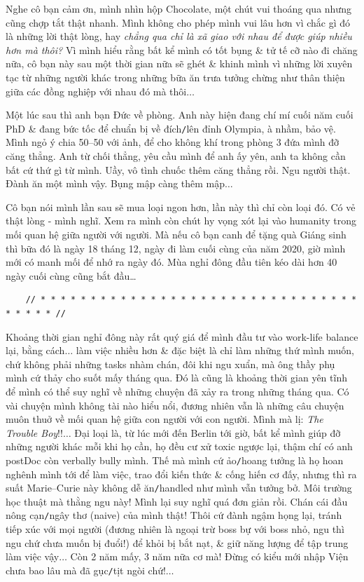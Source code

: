 \documentclass[12pt]{article}
\begin{document}
Nghe cô bạn cảm ơn, mình nhìn hộp Chocolate, một chút vui thoáng qua nhưng cũng chợp tắt thật nhanh. Mình không cho phép mình vui lâu hơn vì chắc gì đó là những lời thật lòng, hay {\it chẳng qua chỉ là xã giao với nhau để được giúp nhiều hơn mà thôi?} Vì mình hiểu rằng bất kể mình có tốt bụng \& tử tế cỡ nào đi chăng nữa, cô bạn này sau một thời gian nữa sẽ ghét \& khinh mình vì những lời xuyên tạc từ những người khác trong những bữa ăn trưa tưởng chừng như thân thiện giữa các đồng nghiệp với nhau đó mà thôi$\ldots$

Một lúc sau thì anh bạn Đức về phòng. Anh này hiện đang chí mí cuối năm cuối PhD \& đang bức tốc để chuẩn bị về đích{\tt/}lên đỉnh Olympia, à nhầm, bảo vệ. Mình ngỏ ý chia 50--50 với ảnh, để cho không khí trong phòng 3 đứa mình đỡ căng thẳng. Anh từ chối thẳng, yêu cầu mình để anh ấy yên, anh ta không cần bất cứ thứ gì từ mình. Uầy, vô tình chuốc thêm căng thẳng rồi. Ngu người thật. Đành ăn một mình vậy. Bụng mập càng thêm mập$\ldots$

Cô bạn nói mình lần sau sẽ mua loại ngon hơn, lần này thì chỉ còn loại đó. Có vẻ thật lòng - mình nghĩ. Xem ra mình còn chút hy vọng xót lại vào humanity trong mối quan hệ giữa người với người. Mà nếu cô bạn canh để tặng quà Giáng sinh thì bữa đó là ngày 18 tháng 12, ngày đi làm cuối cùng của năm 2020, giờ mình mới có manh mối để nhớ ra ngày đó. Mùa nghỉ đông đầu tiên kéo dài hơn 40 ngày cuối cùng cũng bắt đầu\ldots

\begin{verbatim}
	// * * * * * * * * * * * * * * * * * * * * * * * * * * * * * * * * * * * * * //
\end{verbatim}

\noindent
{} Khoảng thời gian nghỉ đông này rất quý giá để mình đầu tư vào work-life balance lại, bằng cách$\ldots$ làm việc nhiều hơn \& đặc biệt là chỉ làm những thứ mình muốn, chứ không phải những tasks nhàm chán, đôi khi ngu xuẩn, mà ông thầy phụ mình cứ thảy cho suốt mấy tháng qua. Đó là cũng là khoảng thời gian yên tĩnh để mình có thể suy nghĩ về những chuyện đã xảy ra trong những tháng qua. Có vài chuyện mình không tài nào hiểu nổi, đương nhiên vẫn là những câu chuyện muôn thuở về mối quan hệ giữa con người với con người. Mình mà lị: {\it The Trouble Boy}!!$\ldots$ Đại loại là, từ lúc mới đến Berlin tới giờ, bất kể mình giúp đỡ những người khác mỗi khi họ cần, họ đều cư xử toxic ngược lại, thậm chí có anh postDoc còn verbally bully mình. Thế mà mình cứ ảo{\tt/}hoang tưởng là họ hoan nghênh mình tới để làm việc, trao đổi kiến thức \& cống hiến cơ đấy, nhưng thì ra suất Marie--Curie này không dễ ăn{\tt/}handled như mình vẫn tưởng bở. Môi trường học thuật mà thằng ngu này! Mình lại suy nghĩ quá đơn giản rồi. Chán cái đầu nông cạn{\tt/}ngây thơ (naive) của mình thật! Thôi cứ đành ngậm họng lại, tránh tiếp xúc với mọi người (đương nhiên là ngoại trừ boss bự với boss nhỏ, ngu thì ngu chứ chưa muốn bị đuổi!) để khỏi bị bắt nạt, \& giữ năng lượng để tập trung làm việc vậy$\ldots$ Còn 2 năm mấy, 3 năm nữa cơ mà! Đừng có kiểu mới nhập Viện chưa bao lâu mà đã gục{\tt/}tịt ngòi chứ!$\ldots$
\end{document}
